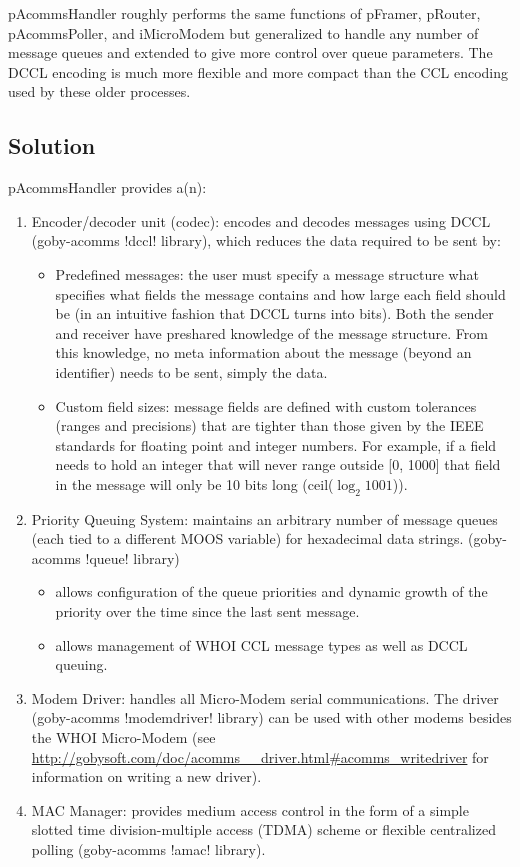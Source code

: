 pAcommsHandler roughly performs the same functions of pFramer, pRouter, pAcommsPoller, and iMicroModem but
generalized to handle any number of message queues and extended to give more control over queue parameters. The DCCL encoding is much more flexible and more compact than the CCL encoding used by these older processes.

\subsection{Solution}
pAcommsHandler provides a(n):
\begin{enumerate}
\item Encoder/decoder unit (codec): encodes and decodes messages using DCCL (goby-acomms !dccl! library), which reduces the data required to be sent by:
\begin{itemize}
\item Predefined messages: the user must specify a message structure what specifies what fields the message contains and how large each field should be (in an intuitive fashion that DCCL turns into bits). Both the sender and receiver have preshared knowledge of the message structure. From this knowledge, no meta information about the message (beyond an identifier) needs to be sent, simply the data. 
\item Custom field sizes: message fields are defined with custom tolerances (ranges and precisions) that are tighter than those given by the IEEE standards for floating point and integer numbers. For example, if a field needs to hold an integer that will never range outside [0, 1000] that field in the message will only be 10 bits long (ceil($\log_2{1001}$)).
\end{itemize}
\item Priority Queuing System: maintains an arbitrary number of message queues (each tied to a different MOOS variable) for hexadecimal data strings. (goby-acomms !queue! library)
\begin{itemize} 
\item allows configuration of the queue priorities and dynamic growth of the priority over the time since the last sent message.
\item allows management of WHOI CCL message types as well as DCCL queuing. 
\end{itemize}
\item Modem Driver: handles all Micro-Modem serial communications. The driver (goby-acomms !modemdriver! library) can be used with other modems besides the WHOI Micro-Modem (see \url{http://gobysoft.com/doc/acomms__driver.html#acomms_writedriver} for information on writing a new driver). 
\item MAC Manager: provides medium access control in the form of a simple slotted time division-multiple access (TDMA) scheme or flexible centralized polling (goby-acomms !amac! library).
\end{enumerate}

